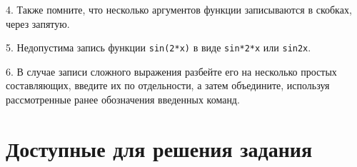 \documentclass[12pt,a4paper]{article}
\begin{document}
4. Также помните, что несколько аргументов функции записываются в скобках, через запятую.

5. Недопустима запись функции \texttt{sin(2*x)} в виде \texttt{sin*2*x} или \texttt{sin2x}.

6. В случае записи сложного выражения разбейте его на несколько простых составляющих, введите их по отдельности, а затем объедините, используя рассмотренные ранее обозначения введенных команд.

\section{Доступные для решения задания}

\end{document}
